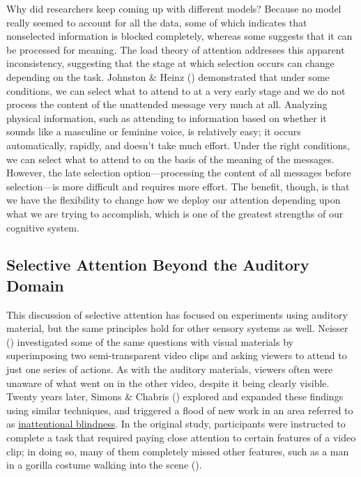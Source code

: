 \documentclass[
]{krantz}
\begin{document}
Why did researchers keep coming up with different models? Because no model really seemed to account for all the data, some of which indicates that nonselected information is blocked completely, whereas some suggests that it can be processed for meaning. The load theory of attention addresses this apparent inconsistency, suggesting that the stage at which selection occurs can change depending on the task. Johnston \& Heinz () demonstrated that under some conditions, we can select what to attend to at a very early stage and we do not process the content of the unattended message very much at all. Analyzing physical information, such as attending to information based on whether it sounds like a masculine or feminine voice, is relatively easy; it occurs automatically, rapidly, and doesn't take much effort. Under the right conditions, we can select what to attend to on the basis of the meaning of the messages. However, the late selection option---processing the content of all messages before selection---is more difficult and requires more effort. The benefit, though, is that we have the flexibility to change how we deploy our attention depending upon what we are trying to accomplish, which is one of the greatest strengths of our cognitive system.

\subsection*{Selective Attention Beyond the Auditory Domain}\label{selective-attention-beyond-the-auditory-domain}


This discussion of selective attention has focused on experiments using auditory material, but the same principles hold for other sensory systems as well. Neisser () investigated some of the same questions with visual materials by superimposing two semi-transparent video clips and asking viewers to attend to just one series of actions. As with the auditory materials, viewers often were unaware of what went on in the other video, despite it being clearly visible. Twenty years later, Simons \& Chabris () explored and expanded these findings using similar techniques, and triggered a flood of new work in an area referred to as \hyperref[inattentional-blindness]{inattentional blindness}. In the original study, participants were instructed to complete a task that required paying close attention to certain features of a video clip; in doing so, many of them completely missed other features, such as a man in a gorilla costume walking into the scene ().
\end{document}
